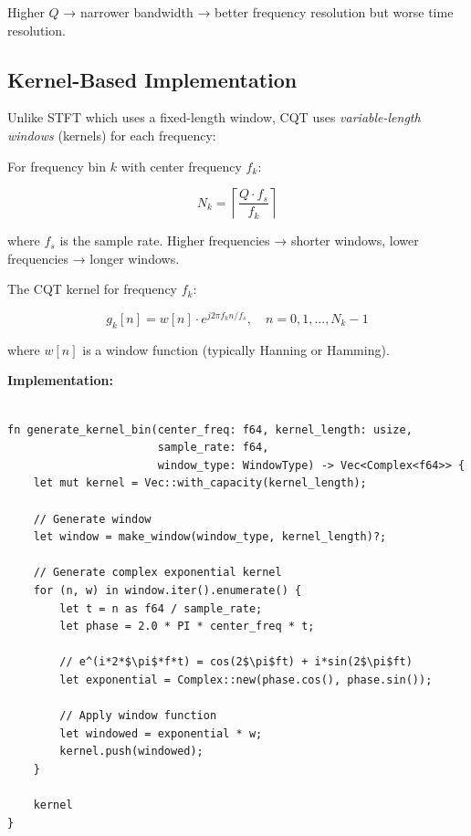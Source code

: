 Higher $Q$ → narrower bandwidth → better frequency resolution but
worse time resolution.

\subsection{Kernel-Based Implementation}

Unlike STFT which uses a fixed-length window, CQT uses
\textit{variable-length windows} (kernels) for each frequency:

For frequency bin $k$ with center frequency $f_k$:

\begin{equation}
  N_k = \left\lceil \frac{Q \cdot f_s}{f_k} \right\rceil
\end{equation}

where $f_s$ is the sample rate. Higher frequencies → shorter windows,
lower frequencies → longer windows.

The CQT kernel for frequency $f_k$:

\begin{equation}
  g_k[n] = w[n] \cdot e^{j2\pi f_k n/f_s}, \quad n = 0, 1, \ldots, N_k-1
\end{equation}

where $w[n]$ is a window function (typically Hanning or Hamming).

\textbf{Implementation:}

\begin{lstlisting}[caption={CQT kernel with windowed complex exponential}]

fn generate_kernel_bin(center_freq: f64, kernel_length: usize,
                       sample_rate: f64,
                       window_type: WindowType) -> Vec<Complex<f64>> {
    let mut kernel = Vec::with_capacity(kernel_length);

    // Generate window
    let window = make_window(window_type, kernel_length)?;

    // Generate complex exponential kernel
    for (n, w) in window.iter().enumerate() {
        let t = n as f64 / sample_rate;
        let phase = 2.0 * PI * center_freq * t;

        // e^(i*2*$\pi$*f*t) = cos(2$\pi$ft) + i*sin(2$\pi$ft)
        let exponential = Complex::new(phase.cos(), phase.sin());

        // Apply window function
        let windowed = exponential * w;
        kernel.push(windowed);
    }

    kernel
}
\end{lstlisting}


